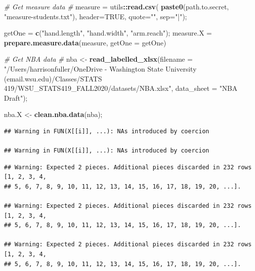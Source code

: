 \documentclass[]{article}
\newenvironment{Shaded}{\begin{snugshade}}{\end{snugshade}}
\newcommand{\CommentTok}[1]{\textcolor[rgb]{0.56,0.35,0.01}{\textit{#1}}}
\newcommand{\DataTypeTok}[1]{\textcolor[rgb]{0.13,0.29,0.53}{#1}}
\newcommand{\KeywordTok}[1]{\textcolor[rgb]{0.13,0.29,0.53}{\textbf{#1}}}
\newcommand{\NormalTok}[1]{#1}
\newcommand{\OperatorTok}[1]{\textcolor[rgb]{0.81,0.36,0.00}{\textbf{#1}}}
\newcommand{\OtherTok}[1]{\textcolor[rgb]{0.56,0.35,0.01}{#1}}
\newcommand{\StringTok}[1]{\textcolor[rgb]{0.31,0.60,0.02}{#1}}
\begin{document}
\begin{Shaded}
\begin{Highlighting}[]
\CommentTok{# Get measure data}
\CommentTok{# }
\NormalTok{measure =}\StringTok{ }\NormalTok{utils}\OperatorTok{::}\KeywordTok{read.csv}\NormalTok{( }\KeywordTok{paste0}\NormalTok{(path.to.secret, }\StringTok{"measure-students.txt"}\NormalTok{), }
                           \DataTypeTok{header=}\OtherTok{TRUE}\NormalTok{, }\DataTypeTok{quote=}\StringTok{""}\NormalTok{, }\DataTypeTok{sep=}\StringTok{"|"}\NormalTok{);}

\NormalTok{getOne =}\StringTok{ }\KeywordTok{c}\NormalTok{(}\StringTok{"hand.length"}\NormalTok{, }\StringTok{"hand.width"}\NormalTok{, }\StringTok{"arm.reach"}\NormalTok{);}
\NormalTok{measure.X =}\StringTok{ }\KeywordTok{prepare.measure.data}\NormalTok{(measure, }
                                 \DataTypeTok{getOne =}\NormalTok{ getOne)}

\CommentTok{# Get NBA data}
\CommentTok{# }
\NormalTok{nba <-}\StringTok{ }\KeywordTok{read_labelled_xlsx}\NormalTok{(}\DataTypeTok{filename =} \StringTok{"/Users/harrisonfuller/OneDrive - Washington State University (email.wsu.edu)/Classes/STATS 419/WSU_STATS419_FALL2020/datasets/NBA.xlsx"}\NormalTok{, }
                          \DataTypeTok{data_sheet =} \StringTok{"NBA Draft"}\NormalTok{);}

\NormalTok{nba.X <-}\StringTok{ }\KeywordTok{clean.nba.data}\NormalTok{(nba);}
\end{Highlighting}
\end{Shaded}

\begin{verbatim}
## Warning in FUN(X[[i]], ...): NAs introduced by coercion

## Warning in FUN(X[[i]], ...): NAs introduced by coercion
\end{verbatim}

\begin{verbatim}
## Warning: Expected 2 pieces. Additional pieces discarded in 232 rows [1, 2, 3, 4,
## 5, 6, 7, 8, 9, 10, 11, 12, 13, 14, 15, 16, 17, 18, 19, 20, ...].

## Warning: Expected 2 pieces. Additional pieces discarded in 232 rows [1, 2, 3, 4,
## 5, 6, 7, 8, 9, 10, 11, 12, 13, 14, 15, 16, 17, 18, 19, 20, ...].

## Warning: Expected 2 pieces. Additional pieces discarded in 232 rows [1, 2, 3, 4,
## 5, 6, 7, 8, 9, 10, 11, 12, 13, 14, 15, 16, 17, 18, 19, 20, ...].
\end{verbatim}
\end{document}
